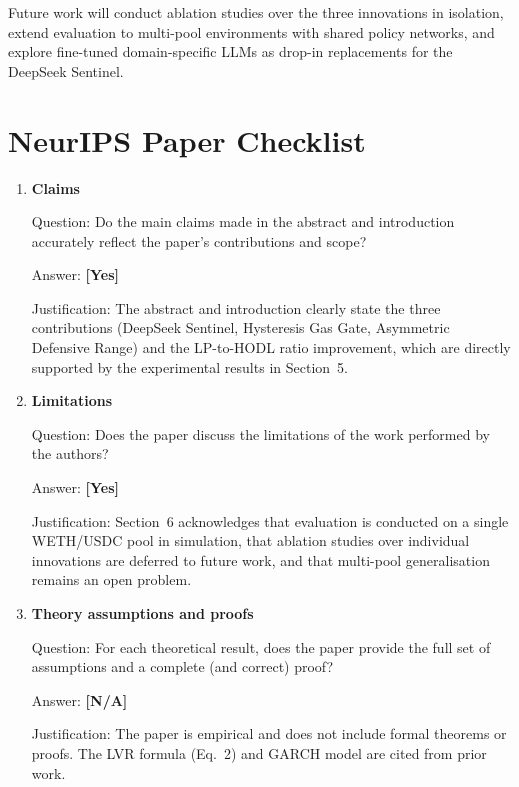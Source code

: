 \documentclass{article}
\begin{document}
Future work will conduct ablation studies over the three innovations in
isolation, extend evaluation to multi-pool environments with shared policy
networks, and explore fine-tuned domain-specific LLMs as drop-in replacements
for the DeepSeek Sentinel.




\newpage
\section*{NeurIPS Paper Checklist}

\begin{enumerate}

\item \textbf{Claims}

Question: Do the main claims made in the abstract and introduction accurately reflect the paper's contributions and scope?

Answer: \textbf{[Yes]}

Justification: The abstract and introduction clearly state the three contributions (DeepSeek Sentinel, Hysteresis Gas Gate, Asymmetric Defensive Range) and the LP-to-HODL ratio improvement, which are directly supported by the experimental results in Section~5.

\item \textbf{Limitations}

Question: Does the paper discuss the limitations of the work performed by the authors?

Answer: \textbf{[Yes]}

Justification: Section~6 acknowledges that evaluation is conducted on a single WETH/USDC pool in simulation, that ablation studies over individual innovations are deferred to future work, and that multi-pool generalisation remains an open problem.

\item \textbf{Theory assumptions and proofs}

Question: For each theoretical result, does the paper provide the full set of assumptions and a complete (and correct) proof?

Answer: \textbf{[N/A]}

Justification: The paper is empirical and does not include formal theorems or proofs. The LVR formula (Eq.~2) and GARCH model are cited from prior work.


\end{enumerate}
\end{document}
